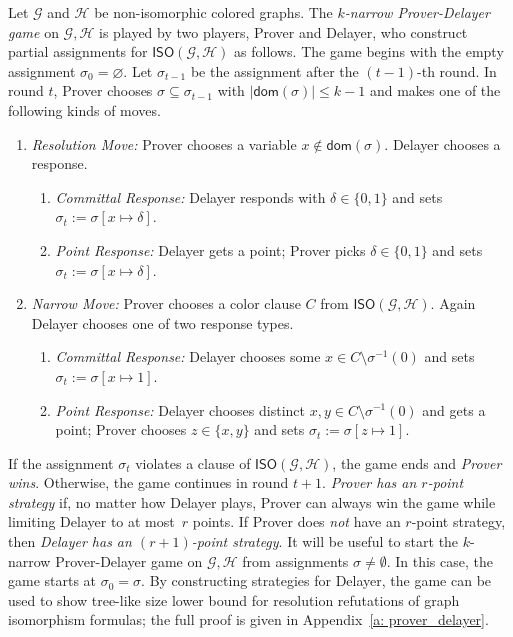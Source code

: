 \documentclass[a4paper,english, thm-restate]{lipics-v2021}
\newcommand{\defining}[1]{\emph{#1}}
\newcommand{\graphG}{\mathcal{G}}
\newcommand{\graphH}{\mathcal{H}}
\newcommand{\dom}{\mathsf{dom}}
\newcommand{\ISO}{\mathsf{ISO}(\graphG, \graphH)}
\newcommand{\ifAppendix}[1]{#1}
\begin{document}
Let $\graphG$ and $\graphH$ be non-isomorphic colored graphs.
The \defining{$k$-narrow Prover-Delayer game} on $\graphG, \graphH$ is played 
by two players, Prover and Delayer, who construct  partial assignments for $\ISO$ as follows. The game begins with the empty assignment $\sigma_0 = 
\varnothing$.
Let $\sigma_{t-1}$ be the assignment after the $(t-1)$-th round.
In round $t$, Prover chooses $\sigma \subseteq \sigma_{t-1}$ with $|\dom(\sigma)| \le k-1$ and makes one of the following kinds of moves.
\begin{enumerate}
\item \defining{Resolution Move:} Prover chooses a variable $x \not \in \dom(\sigma)$. Delayer chooses a response. 
\begin{enumerate}
\item \defining{Committal Response:} Delayer responds with $\delta \in \{0,1\}$ and sets $\sigma_t := \sigma [x \mapsto \delta ]$.
\item  \defining{Point Response:} Delayer gets a point; Prover picks $\delta \in \{0,1\}$ and sets $\sigma_t := \sigma [x \mapsto \delta ]$.
\end{enumerate}
\item  \defining{Narrow Move:} Prover chooses a color clause $C$ from $\ISO$. Again Delayer chooses one of two response types.
\begin{enumerate}
\item \defining{Committal Response:} Delayer chooses some $x \in C \setminus \sigma^{-1}(0)$ and sets $\sigma_t := \sigma [ x \mapsto 1 ]$.
\item  \defining{Point Response:} Delayer chooses distinct $x,y \in C \setminus \sigma^{-1}(0)$ and gets a point; Prover chooses $z \in \{x,y\}$ and sets $\sigma_t := \sigma [z \mapsto1 ]$. 
\end{enumerate}
\end{enumerate} 
\noindent If the assignment $\sigma_t$ violates a clause of $\ISO$,
the game ends and \defining{Prover wins}.  Otherwise, the game continues in round $t+1$. \defining{Prover has an $r$-point strategy} if, no matter how Delayer plays, Prover can always win the game while limiting Delayer to at most~$r$ points. If Prover does \emph{not} have an $r$-point strategy, then \defining{Delayer has an $(r+1)$-point strategy}.
It will be useful to start the $k$-narrow Prover-Delayer game on $\graphG, \graphH$ from assignments $\sigma \neq \emptyset$. In this case, the game starts at $\sigma_0 = \sigma$.
%
By constructing strategies for Delayer, the game can be used to show tree-like size lower bound for resolution refutations of graph isomorphism formulas\ifAppendix{; the full proof is given in Appendix~\ref{a: prover_delayer}}.
\end{document}
